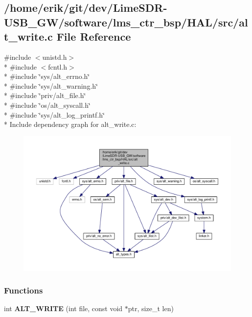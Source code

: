 \subsection{/home/erik/git/dev/\+Lime\+S\+D\+R-\/\+U\+S\+B\+\_\+\+G\+W/software/lms\+\_\+ctr\+\_\+bsp/\+H\+A\+L/src/alt\+\_\+write.c File Reference}
\label{alt__write_8c}
{\ttfamily \#include $<$unistd.\+h$>$}\\*
{\ttfamily \#include $<$fcntl.\+h$>$}\\*
{\ttfamily \#include \char`\"{}sys/alt\+\_\+errno.\+h\char`\"{}}\\*
{\ttfamily \#include \char`\"{}sys/alt\+\_\+warning.\+h\char`\"{}}\\*
{\ttfamily \#include \char`\"{}priv/alt\+\_\+file.\+h\char`\"{}}\\*
{\ttfamily \#include \char`\"{}os/alt\+\_\+syscall.\+h\char`\"{}}\\*
{\ttfamily \#include \char`\"{}sys/alt\+\_\+log\+\_\+printf.\+h\char`\"{}}\\*
Include dependency graph for alt\+\_\+write.\+c\+:
\nopagebreak
\begin{figure}[H]
\begin{center}
\leavevmode
\includegraphics[width=350pt]{d4/d9f/alt__write_8c__incl}
\end{center}
\end{figure}
\subsubsection*{Functions}
\begin{DoxyCompactItemize}
\item 
int {\bf A\+L\+T\+\_\+\+W\+R\+I\+TE} (int file, const void $\ast$ptr, size\+\_\+t len)
\end{DoxyCompactItemize}


